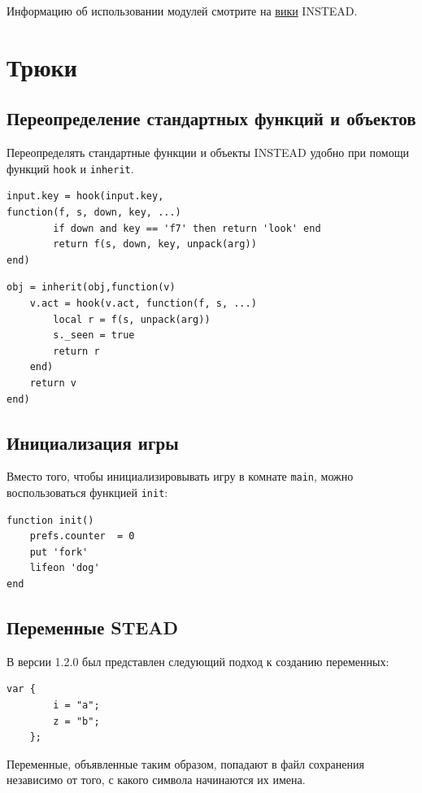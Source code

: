 \documentclass[a4paper,12pt]{article}
\begin{document}
Информацию об использовании модулей смотрите на \href{http://instead.pinebrush.com/wiki/ru/gamedev/modules}{вики} INSTEAD.

\section{Трюки}
\subsection{Переопределение стандартных функций и объектов}


Переопределять стандартные функции и объекты INSTEAD удобно при помощи функций \verb/hook/ и \verb/inherit/.

\begin{verbatim}
input.key = hook(input.key,
function(f, s, down, key, ...)
        if down and key == 'f7' then return 'look' end 
        return f(s, down, key, unpack(arg))
end)
\end{verbatim}
\begin{verbatim}
obj = inherit(obj,function(v)
    v.act = hook(v.act, function(f, s, ...)
        local r = f(s, unpack(arg))
        s._seen = true
        return r
    end)
    return v
end)
\end{verbatim}
\subsection{Инициализация игры}
Вместо того, чтобы инициализировывать игру в комнате \verb/main/, можно воспользоваться функцией \verb/init/:
\begin{verbatim}
function init()
    prefs.counter  = 0
    put 'fork'
    lifeon 'dog'
end
\end{verbatim}
\subsection{Переменные STEAD}
В версии 1.2.0 был представлен следующий подход к созданию переменных:

\begin{verbatim}
var {
        i = "a";
        z = "b";
    };
\end{verbatim}

Переменные, объявленные таким образом, попадают в файл сохранения независимо от того, с какого символа начинаются их имена.
\end{document}
